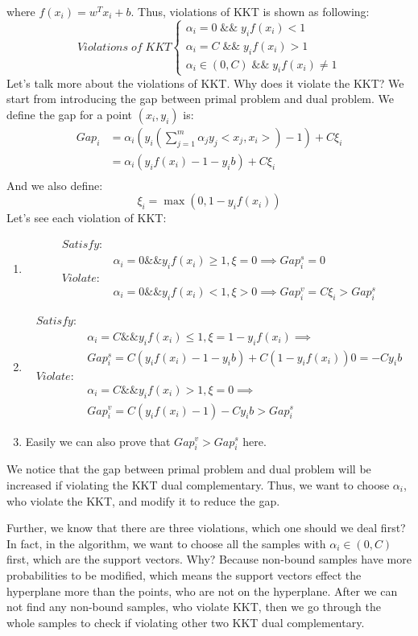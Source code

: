 \documentclass[a4paper]{article}
\begin{document}
\begin{itemize}
{where $f(x_i) = w^T x_i + b$. Thus, violations of KKT is shown as following:
\[ Violations\; of\; KKT \left\{ 
  		\begin{array}{l}
			\alpha_i=0 \; \&\& \; y_if(x_i) < 1 \\
			\alpha_i=C \; \&\& \; y_if(x_i) > 1 \\
			\alpha_i \in (0, C) \; \&\&\; y_if(x_i) \neq 1 
 		 \end{array} \right.\]
}
Let's talk more about the violations of KKT. Why does it violate the KKT? We start from introducing the gap between primal problem and dual problem. We define the gap for a point $(x_i, y_i)$ is:
\begin{align*}
Gap_i &= \alpha_i (y_i(\sum_{j=1}^{m}\alpha_j y_j <x_j, x_i>) - 1) + C\xi_i \\
	  &= \alpha_i (y_i f(x_i) - 1 - y_i b) + C\xi_i \\
\end{align*}
And we also define:
$$
\xi_i = \max(0, 1 - y_i f(x_i))
$$
Let's see each violation of KKT:
\begin{enumerate}
\item{
\begin{align*}
Satisfy:&\\ 
&\alpha_i=0 \&\& y_i f(x_i) \geq 1, \xi=0 \implies  Gap_i^s = 0\\
Violate:& \\ 
&\alpha_i=0 \&\& y_if(x_i) < 1, \xi>0 \implies Gap_i^v =  C\xi_i > Gap_i^s
\end{align*}
}
\item{
\begin{align*}
Satisfy:&\\ 
&\alpha_i=C \&\& y_i f(x_i) \leq 1, \xi=1-y_if(x_i) \implies \\
&Gap_i^s = C(y_if(x_i)-1-y_ib) + C(1-y_if(x_i)) 0 = -Cy_i b \\
Violate:& \\ 
&\alpha_i=C \&\& y_if(x_i) > 1, \xi=0 \implies \\
&Gap_i^v = C(y_if(x_i)-1) - Cy_ib > Gap_i^s
\end{align*}
}
\item{
Easily we can also prove that $Gap_i^v > Gap_i^s$ here.
}
\end{enumerate}
We notice that the gap between primal problem and dual problem will be increased if violating the KKT dual complementary. Thus, we want to choose $\alpha_i$, who violate the KKT, and modify it to reduce the gap. 

Further, we know that there are three violations, which one should we deal first? In fact, in the algorithm, we want to choose all the samples with $\alpha_i \in (0, C)$ first, which are the support vectors. Why? Because non-bound samples have more probabilities to be modified, which means the support vectors effect the hyperplane more than the points, who are not on the hyperplane. After we can not find any non-bound samples, who violate KKT, then we go through the whole samples to check if violating other two KKT dual complementary.


\end{itemize}
\end{document}
